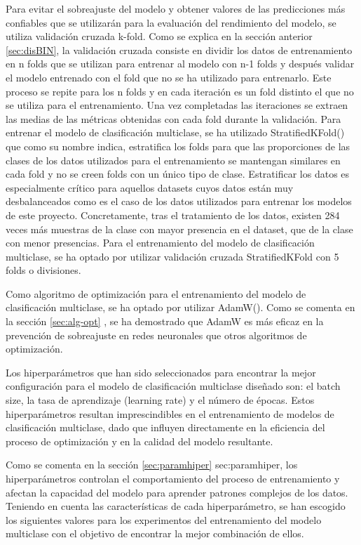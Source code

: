 Para evitar el sobreajuste del modelo y obtener valores de las predicciones más confiables que se utilizarán para la evaluación del rendimiento del modelo, se utiliza validación cruzada k-fold. Como se explica en la sección anterior \ref{sec:disBIN}, la validación cruzada consiste en dividir los datos de entrenamiento en n folds que se utilizan para entrenar al modelo con n-1 folds y después validar el modelo entrenado con el fold que no se ha utilizado para entrenarlo. Este proceso se repite para los n folds y en cada iteración es un fold distinto el que no se utiliza para el entrenamiento. Una vez completadas las iteraciones se extraen las medias de las métricas obtenidas con cada fold durante la validación. Para entrenar el modelo de clasificación multiclase, se ha utilizado StratifiedKFold() que como su nombre indica, estratifica los folds para que las proporciones de las clases de los datos utilizados para el entrenamiento se mantengan similares en cada fold y no se creen folds con un único tipo de clase. Estratificar los datos es especialmente crítico para aquellos datasets cuyos datos están muy desbalanceados como es el caso de los datos utilizados para entrenar los modelos de este proyecto. Concretamente, tras el tratamiento de los datos, existen 284 veces más muestras de la clase con mayor presencia en el dataset, que de la clase con menor presencias. Para el entrenamiento del modelo de clasificación multiclase, se ha optado por utilizar validación cruzada StratifiedKFold con 5 folds o divisiones.

Como algoritmo de optimización para el entrenamiento del modelo de clasificación multiclase, se ha optado por utilizar AdamW(). Como se comenta en la sección \ref{sec:alg-opt} , se ha demostrado que AdamW es más eficaz en la prevención de sobreajuste en redes neuronales que otros algoritmos de optimización.

Los hiperparámetros que han sido seleccionados para encontrar la mejor configuración para el modelo de clasificación multiclase diseñado son: el batch size, la tasa de aprendizaje (learning rate) y el número de épocas. Estos hiperparámetros resultan imprescindibles en el entrenamiento de modelos de clasificación multiclase, dado que influyen directamente en la eficiencia del proceso de optimización y en la calidad del modelo resultante.

Como se comenta en la sección \ref{sec:paramhiper} \refname{sec:paramhiper}, los hiperparámetros controlan el comportamiento del proceso de entrenamiento y afectan la capacidad del modelo para aprender patrones complejos de los datos. Teniendo en cuenta las características de cada hiperparámetro, se han escogido los siguientes valores para los experimentos del entrenamiento del modelo multiclase con el objetivo de encontrar la mejor combinación de ellos.

